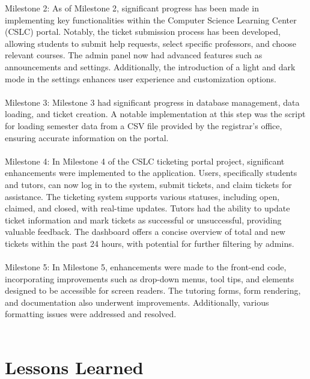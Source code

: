 \documentclass[oneside,openany,obeyspaces]{book}
\newcommand\tab[1][1cm]{\hspace*{#1}}
\begin{document}
\begin{flushleft}
    \tab Milestone 2: As of Milestone 2, significant progress has been made in implementing key functionalities within the Computer Science Learning Center (CSLC) portal. Notably, the ticket submission process has been developed, allowing students to submit help requests, select specific professors, and choose relevant courses. The admin panel now had advanced features such as announcements and settings. Additionally, the introduction of a light and dark mode in the settings enhances user experience and customization options.\\~\\

    \tab Milestone 3: Milestone 3 had significant progress in database management, data loading, and ticket creation. A notable implementation at this step was the script for loading semester data from a CSV file provided by the registrar's office, ensuring accurate information on the portal.\\~\\

    \tab Milestone 4: In Milestone 4 of the CSLC ticketing portal project, significant enhancements were implemented to the application. Users, specifically students and tutors, can now log in to the system, submit tickets, and claim tickets for assistance. The ticketing system supports various statuses, including open, claimed, and closed, with real-time updates. Tutors had the ability to update ticket information and mark tickets as successful or unsuccessful, providing valuable feedback. The dashboard offers a concise overview of total and new tickets within the past 24 hours, with potential for further filtering by admins.\\~\\

    \tab Milestone 5: In Milestone 5, enhancements were made to the front-end code, incorporating improvements such as drop-down menus, tool tips, and elements designed to be accessible for screen readers. The tutoring forms, form rendering, and documentation also underwent improvements. Additionally, various formatting issues were addressed and resolved.\\~\\


    \section{Lessons Learned}


\end{flushleft}
\end{document}
